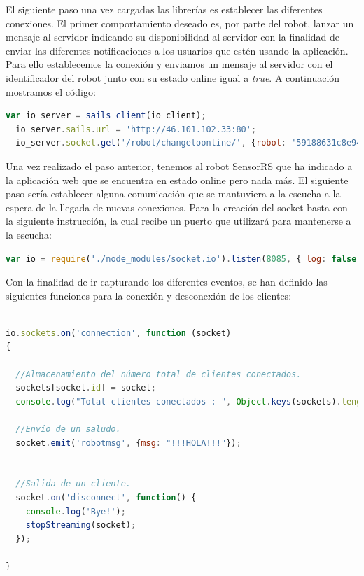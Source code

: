 El siguiente paso una vez cargadas las librerías es establecer las diferentes conexiones. El primer comportamiento deseado es, por parte del robot, lanzar un mensaje al servidor indicando su disponibilidad al servidor con la finalidad de
enviar las diferentes notificaciones a los usuarios que estén usando la aplicación. Para ello establecemos la conexión y enviamos un mensaje al servidor con el identificador del robot junto con su estado online igual a \emph{true}. A continuación mostramos
el código:\\

\begin{lstlisting}[language=JavaScript]
  var io_server = sails_client(io_client);
  io_server.sails.url = 'http://46.101.102.33:80';
  io_server.socket.get('/robot/changetoonline/', {robot: '59188631c8e94ba54f7a4bdc', online: true});
\end{lstlisting}

Una vez realizado el paso anterior, tenemos al robot SensorRS que ha indicado a la aplicación web que se encuentra en estado online pero nada más. El siguiente paso sería establecer alguna 
comunicación que se mantuviera a la escucha a la espera de la llegada de nuevas conexiones. Para la creación del socket basta con la siguiente instrucción, la cual recibe un puerto que 
utilizará para mantenerse a la escucha:\\

\begin{lstlisting}[language=JavaScript]
  var io = require('./node_modules/socket.io').listen(8085, { log: false });
\end{lstlisting}


Con la finalidad de ir capturando los diferentes eventos, se han definido las siguientes funciones para la conexión y desconexión de los clientes:\\

\begin{lstlisting}[language=JavaScript]

io.sockets.on('connection', function (socket)
{

  //Almacenamiento del número total de clientes conectados.
  sockets[socket.id] = socket;
  console.log("Total clientes conectados : ", Object.keys(sockets).length);
  
  //Envío de un saludo.
  socket.emit('robotmsg', {msg: "!!!HOLA!!!"});


  //Salida de un cliente.
  socket.on('disconnect', function() {
    console.log('Bye!');
    stopStreaming(socket);
  });  
  
}
\end{lstlisting}


